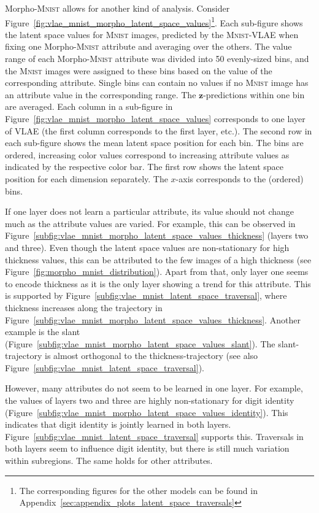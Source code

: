 Morpho-\textsc{Mnist} allows for another kind of analysis.
Consider Figure~\ref{fig:vlae_mnist_morpho_latent_space_values}\footnote{The corresponding figures for the other models can be found in Appendix~\ref{sec:appendix_plots_latent_space_traversals}}.
Each sub-figure shows the latent space values for \textsc{Mnist} images, predicted by the \textsc{Mnist}-\ac{VLAE} when fixing one Morpho-\textsc{Mnist} attribute and averaging over the others.
The value range of each Morpho-\textsc{Mnist} attribute was divided into 50 evenly-sized bins, and the \textsc{Mnist} images were assigned to these bins based on the value of the corresponding attribute.
Single bins can contain no values if no \textsc{Mnist} image has an attribute value in the corresponding range.
The $\bm{z}$-predictions within one bin are averaged.
Each column in a sub-figure in Figure~\ref{fig:vlae_mnist_morpho_latent_space_values} corresponds to one layer of \ac{VLAE} (the first column corresponds to the first layer, etc.).
The second row in each sub-figure shows the mean latent space position for each bin.
The bins are ordered, increasing color values correspond to increasing attribute values as indicated by the respective color bar.
The first row shows the latent space position for each dimension separately.
The $x$-axis corresponds to the (ordered) bins.

If one layer does not learn a particular attribute, its value should not change much as the attribute values are varied.
For example, this can be observed in Figure~\ref{subfig:vlae_mnist_morpho_latent_space_values_thickness} (layers two and three).
Even though the latent space values are non-stationary for high thickness values, this can be attributed to the few images of a high thickness (see Figure~\ref{fig:morpho_mnist_distribution}).
Apart from that, only layer one seems to encode thickness as it is the only layer showing a trend for this attribute.
This is supported by Figure~\ref{subfig:vlae_mnist_latent_space_traversal}, where thickness increases along the trajectory in Figure~\ref{subfig:vlae_mnist_morpho_latent_space_values_thickness}.
Another example is the slant (Figure~\ref{subfig:vlae_mnist_morpho_latent_space_values_slant}).
The slant-trajectory is almost orthogonal to the thickness-trajectory (see also Figure~\ref{subfig:vlae_mnist_latent_space_traversal}).

However, many attributes do not seem to be learned in one layer.
For example, the values of layers two and three are highly non-stationary for digit identity (Figure~\ref{subfig:vlae_mnist_morpho_latent_space_values_identity}).
This indicates that digit identity is jointly learned in both layers.
Figure~\ref{subfig:vlae_mnist_latent_space_traversal} supports this.
Traversals in both layers seem to influence digit identity, but there is still much variation within subregions.
The same holds for other attributes.

